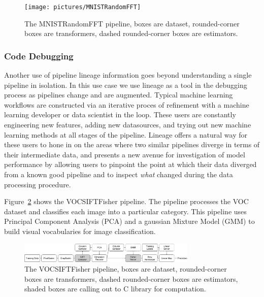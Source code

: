 \documentclass{sig-alternate}
\begin{document}
\begin{figure}[ht]
\begin{center}
    \texttt{[image: pictures/MNISTRandomFFT]}
    \caption {The MNISTRandomFFT pipeline, boxes are dataset, rounded-corner boxes are transformers, dashed rounded-corner boxes are estimators.
    \label{fig:mnistrandomfft}
}
\end{center}
\end{figure}

\subsubsection{Code Debugging}
Another use of pipeline lineage information goes beyond understanding a single pipeline in isolation.
In this use case we use lineage as a tool in the debugging process as pipelines change and are augmented. 
Typical machine learning workflows are constructed via an iterative proces of refinement with a machine learning developer or data scientist in the loop.
These users are constantly engineering new features, adding new datasources, and trying out new machine learning methods at all stages of the pipeline.
Lineage offers a natural way for these users to hone in on the areas where two similar pipelines diverge in terms of their intermediate data, and presents a new avenue for investigation of model performance by allowing users to pinpoint the point at which their data diverged from a known good pipeline and to inspect \emph{what} changed during the data processing procedure. 

Figure~\ref{fig:vocsiftfisher} shows the VOCSIFTFisher pipeline. The pipeline processes the VOC dataset and classifies each image into a particular category.
This pipeline uses Principal Component Analysis (PCA) and a gaussian Mixture Model (GMM) to build visual vocabularies for image classification.
\begin{figure}[ht]
\begin{center}
    \includegraphics[width=85mm]{pictures/VOCSIFTFisher}
    \caption {The VOCSIFTFisher pipeline, boxes are dataset, rounded-corner boxes are transformers, dashed rounded-corner boxes are estimators, shaded boxes are calling out to C library for computation.
    \label{fig:vocsiftfisher}
}
\end{center}
\end{figure}
\end{document}
